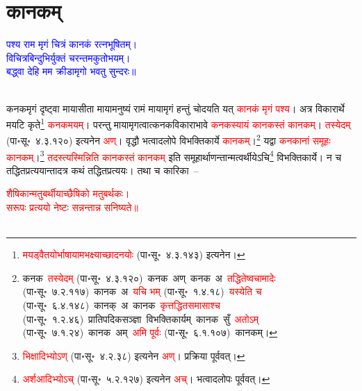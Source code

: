\section[कानकम्]{कानकम्}
\centering\textcolor{blue}{पश्य राम मृगं चित्रं कानकं रत्नभूषितम्।\nopagebreak\\
विचित्रबिन्दुभिर्युक्तं चरन्तमकुतोभयम्।\nopagebreak\\
बद्ध्वा देहि मम क्रीडामृगो भवतु सुन्दरः॥}\nopagebreak\\
\\
\begin{sloppypar}\justifying\noindent\hspace{10mm} कनक\-मृगं दृष्ट्वा माया\-सीता माया\-मनुष्यं रामं माया\-मृगं हन्तुं चोदयति यत् \textcolor{red}{कानकं मृगं पश्य}। अत्र विकारार्थे मयटि कृते\footnote{\textcolor{red}{मयड्वैतयोर्भाषायामभक्ष्याच्छादनयोः} (पा॰सू॰~४.३.१४३) इत्यनेन।} \textcolor{red}{कनक\-मयम्}। परन्तु माया\-मृगत्वात्कनक\-विकाराभावे \textcolor{red}{कनकस्यायं कानकस्तं कानकम्}। \textcolor{red}{तस्येदम्} (पा॰सू॰~४.३.१२०) इत्यनेन \textcolor{red}{अण्}। वृद्धौ भत्वादलोपे विभक्तिकार्ये \textcolor{red}{कानकम्}।\footnote{कनक~\arrow \textcolor{red}{तस्येदम्} (पा॰सू॰~४.३.१२०)~\arrow कनक~अण्~\arrow कनक~अ~\arrow \textcolor{red}{तद्धितेष्वचामादेः} (पा॰सू॰~७.२.११७)~\arrow कानक~अ~\arrow \textcolor{red}{यचि भम्} (पा॰सू॰~१.४.१८)~\arrow \textcolor{red}{यस्येति च} (पा॰सू॰~६.४.१४८)~\arrow कानक्~अ~\arrow कानक~\arrow \textcolor{red}{कृत्तद्धित\-समासाश्च} (पा॰सू॰~१.२.४६)~\arrow प्रातिपदिक\-सञ्ज्ञा~\arrow विभक्तिकार्यम्~\arrow कानक~सुँ~\arrow \textcolor{red}{अतोऽम्} (पा॰सू॰~७.१.२४)~\arrow कानक~अम्~\arrow \textcolor{red}{अमि पूर्वः} (पा॰सू॰~६.१.१०७)~\arrow कानकम्।} यद्वा \textcolor{red}{कनकानां समूहः कानकम्}।\footnote{\textcolor{red}{भिक्षादिभ्योऽण्} (पा॰सू॰~४.२.३८) इत्यनेन \textcolor{red}{अण्}। प्रक्रिया पूर्ववत्।} \textcolor{red}{तदस्त्यस्मिन्निति कानकस्तं कानकम्} इति समूहार्थाणन्तान्मत्वर्थीयेऽचि\footnote{\textcolor{red}{अर्शआदिभ्योऽच्} (पा॰सू॰~५.२.१२७) इत्यनेन \textcolor{red}{अच्}। भत्वादलोपः पूर्ववत्।} विभक्ति\-कार्ये।
न च तद्धित\-प्रत्ययान्तादत्र कथं तद्धित\-प्रत्ययः। तथा च कारिका~–\end{sloppypar}
\centering\textcolor{red}{शैषिकान्मतुबर्थीयाच्छैषिको मतुबर्थकः।\nopagebreak\\
सरूपः प्रत्ययो नेष्टः सन्नन्तान्न सनिष्यते॥}\nopagebreak\\
\\
